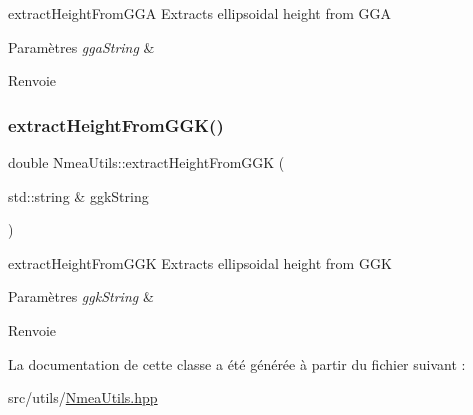 extract\+Height\+From\+G\+GA Extracts ellipsoidal height from G\+GA 


\begin{DoxyParams}{Paramètres}
{\em gga\+String} & \\
\hline
\end{DoxyParams}
\begin{DoxyReturn}{Renvoie}

\end{DoxyReturn}
\mbox{\label{classNmeaUtils_a35921c270ebfc026fd911ad8c18e8328}} 
\subsubsection{\texorpdfstring{extract\+Height\+From\+G\+G\+K()}{extractHeightFromGGK()}}
{\footnotesize\ttfamily double Nmea\+Utils\+::extract\+Height\+From\+G\+GK (\begin{DoxyParamCaption}\item[{std\+::string \&}]{ggk\+String }\end{DoxyParamCaption})\hspace{0.3cm}{\ttfamily [static]}}



extract\+Height\+From\+G\+GK Extracts ellipsoidal height from G\+GK 


\begin{DoxyParams}{Paramètres}
{\em ggk\+String} & \\
\hline
\end{DoxyParams}
\begin{DoxyReturn}{Renvoie}

\end{DoxyReturn}


La documentation de cette classe a été générée à partir du fichier suivant \+:\begin{DoxyCompactItemize}
\item 
src/utils/\hyperlink{NmeaUtils_8hpp}{Nmea\+Utils.\+hpp}\end{DoxyCompactItemize}
